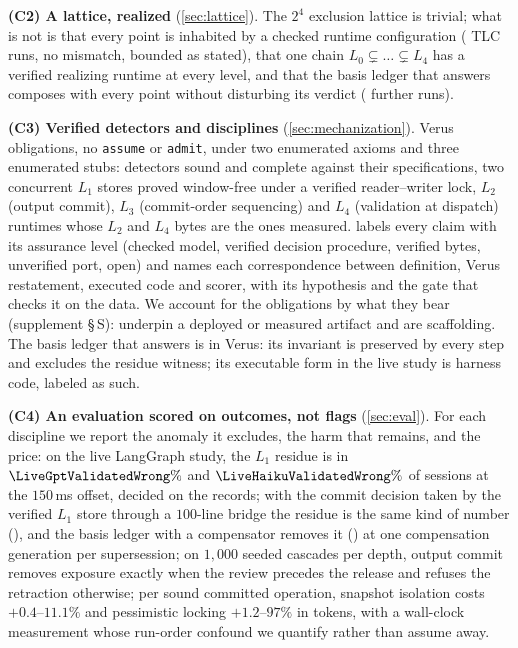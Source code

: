 \smallskip\noindent\textbf{(C2) A lattice, realized} (\cref{sec:lattice}). The
$2^4$ exclusion lattice is trivial; what is not is that every point is inhabited
by a checked runtime configuration (\LatticeRuns{} TLC runs, no mismatch,
bounded as stated), that one chain $L_0\subsetneq\dots\subsetneq L_4$ has a
verified realizing runtime at every level, and that the basis ledger that
answers \Rp{} composes with every point without disturbing its verdict
(\LatticeThirtyTwoRuns{} further runs).

\smallskip\noindent\textbf{(C3) Verified detectors and disciplines}
(\cref{sec:mechanization}). \VerusCurated{} Verus obligations, no
\texttt{assume} or \texttt{admit}, under two enumerated axioms and three
enumerated stubs: detectors sound and complete against their specifications,
two concurrent $L_1$ stores proved window-free under a verified reader--writer
lock, $L_2$ (output commit), $L_3$ (commit-order sequencing) and $L_4$
(validation at dispatch) runtimes whose $L_2$ and $L_4$ bytes are the ones
measured.  labels every claim with its assurance
level (checked model, verified decision procedure, verified bytes,
unverified port, open) and names each correspondence between \TLA{}
definition, Verus restatement, executed code and scorer, with its hypothesis
and the gate that checks it on the data.
We account for the obligations by what they bear (supplement \S\,S):
\VerusLoadBearing{} underpin a deployed or measured artifact and
\VerusScaffold{} are scaffolding. The basis ledger that answers \Rp{} is
\LfiveVerusIntro{} in Verus: its invariant is preserved by every step and
excludes the residue witness; its executable form in the live study is
harness code, labeled as such.

\smallskip\noindent\textbf{(C4) An evaluation scored on outcomes, not flags}
(\cref{sec:eval}). For each discipline we report the anomaly it excludes, the
harm that remains, and the price: on the live LangGraph study, the $L_1$
residue is \Rp{} in $\LiveGptValidatedWrong\%$ and
$\LiveHaikuValidatedWrong\%$ of sessions at the $150$\,ms offset, decided on
the records; with the commit decision taken by the verified $L_1$ store
through a $100$-line bridge the residue is the same kind of number
(\LiveVerifiedOutcome), and the basis ledger with a compensator removes it
(\LfiveLiveOutcome) at one compensation generation per supersession; on
$1{,}000$ seeded cascades per
depth, output commit removes exposure exactly when the review precedes the
release and refuses the retraction otherwise; per sound committed operation,
snapshot isolation costs $+0.4$--$11.1\%$ and pessimistic locking
$+1.2$--$97\%$ in tokens, with a wall-clock measurement whose run-order
confound we quantify rather than assume away.

